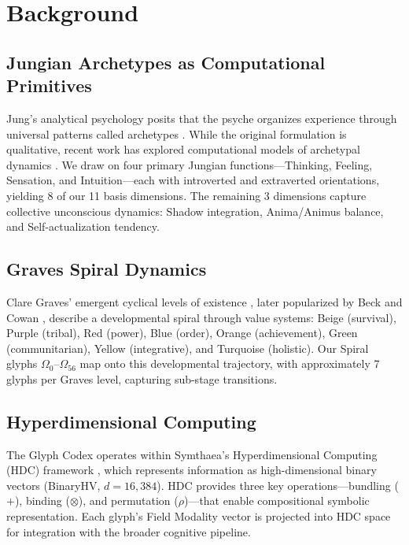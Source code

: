 \documentclass[11pt,a4paper]{article}
\begin{document}
\section{Background}

\subsection{Jungian Archetypes as Computational Primitives}

Jung's analytical psychology posits that the psyche organizes experience through universal patterns called archetypes \citep{jung1968}. While the original formulation is qualitative, recent work has explored computational models of archetypal dynamics \citep{saunders2016}. We draw on four primary Jungian functions---Thinking, Feeling, Sensation, and Intuition---each with introverted and extraverted orientations, yielding 8 of our 11 basis dimensions. The remaining 3 dimensions capture collective unconscious dynamics: Shadow integration, Anima/Animus balance, and Self-actualization tendency.

\subsection{Graves Spiral Dynamics}

Clare Graves' emergent cyclical levels of existence \citep{graves1970}, later popularized by Beck and Cowan \citep{beck1996}, describe a developmental spiral through value systems: Beige (survival), Purple (tribal), Red (power), Blue (order), Orange (achievement), Green (communitarian), Yellow (integrative), and Turquoise (holistic). Our Spiral glyphs $\Omega_0$--$\Omega_{56}$ map onto this developmental trajectory, with approximately 7 glyphs per Graves level, capturing sub-stage transitions.

\subsection{Hyperdimensional Computing}

The Glyph Codex operates within Symthaea's Hyperdimensional Computing (HDC) framework \citep{kanerva2009}, which represents information as high-dimensional binary vectors (BinaryHV, $d = 16{,}384$). HDC provides three key operations---bundling ($+$), binding ($\otimes$), and permutation ($\rho$)---that enable compositional symbolic representation. Each glyph's Field Modality vector is projected into HDC space for integration with the broader cognitive pipeline.
\end{document}
